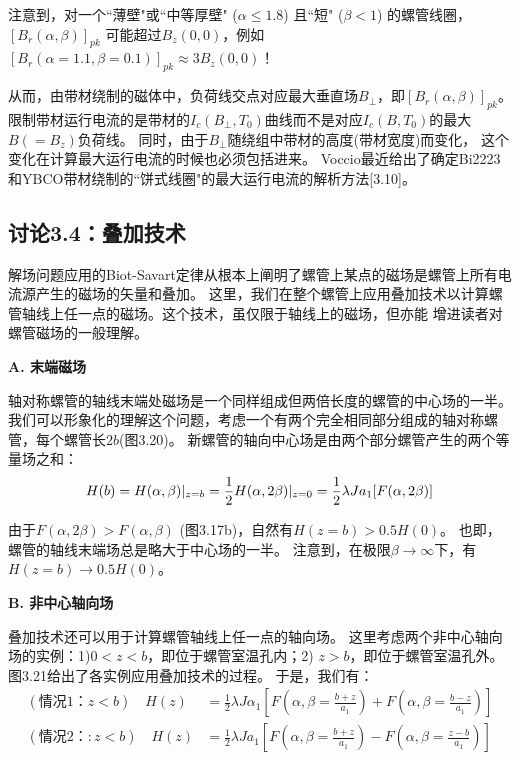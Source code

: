 注意到，对一个``薄壁"或``中等厚壁" ($\alpha \le 1.8$) 且``短" ($\beta < 1$) 的螺管线圈，
$[B_r(\alpha,\beta)]_{pk}$ 可能超过$B_z(0, 0)$，例如$[B_r(\alpha=1.1,\beta=0.1)]_{pk}\approx 3B_z(0,0)$！

从而，由带材绕制的磁体中，负荷线交点对应最大垂直场$B_{\perp}$，即$[B_r(\alpha,\beta)]_{pk}$。
限制带材运行电流的是带材的$I_c(B_{\perp},T_0)$曲线而不是对应$I_c(B, T_0)$的最大$B(=B_z)$负荷线。
同时，由于$B_{\perp}$随绕组中带材的高度(带材宽度)而变化，
这个变化在计算最大运行电流的时候也必须包括进来。
Voccio最近给出了确定Bi2223和YBCO带材绕制的``饼式线圈"的最大运行电流的解析方法[3.10]。



\subsection{讨论3.4：叠加技术}
解场问题应用的Biot-Savart定律从根本上阐明了螺管上某点的磁场是螺管上所有电流源产生的磁场的矢量和叠加。
这里，我们在整个螺管上应用叠加技术以计算螺管轴线上任一点的磁场。这个技术，虽仅限于轴线上的磁场，但亦能
增进读者对螺管磁场的一般理解。

\textbf{A. 末端磁场}

轴对称螺管的轴线末端处磁场是一个同样组成但两倍长度的螺管的中心场的一半。
我们可以形象化的理解这个问题，考虑一个有两个完全相同部分组成的轴对称螺管，每个螺管长$2b$(图3.20)。
新螺管的轴向中心场是由两个部分螺管产生的两个等量场之和：
\begin{equation}
H(b)=H(\alpha,\beta)|_{z=b}=\frac{1}{2}H(\alpha,2\beta)|_{z=0}=\frac{1}{2}\lambda Ja_{1}[F(\alpha,2\beta)]\\%
\end{equation}

由于$F(\alpha, 2\beta)>F(\alpha,\beta)$ (图3.17b)，自然有$H(z=b)>0.5H(0)$。
也即，螺管的轴线末端场总是略大于中心场的一半。
注意到，在极限$\beta\rightarrow\infty$下，有$H(z=b)\rightarrow 0.5H(0)$。

\textbf{B. 非中心轴向场}

叠加技术还可以用于计算螺管轴线上任一点的轴向场。
这里考虑两个非中心轴向场的实例：1)$0<z<b$，即位于螺管室温孔内；2) $z > b$，即位于螺管室温孔外。
图3.21给出了各实例应用叠加技术的过程。
于是，我们有：
\begin{subequations}
	\begin{align}
(\mbox{情况1：}z<b)\quad H(z)&=\frac{1}{2}\lambda J\alpha_{1}[F(\alpha,\beta=\frac{b+z}{a_{1}})+F(\alpha,\beta=\frac{b-z}{a_{1}})]\\%
(\mbox{情况2：}:z<b)\quad H(z)&=\frac{1}{2}\lambda Ja_{1}[F(\alpha,\beta=\frac{b+z}{a_{1}})-F(\alpha,\beta=\frac{z-b}{a_{1}})]%
	\end{align}
\end{subequations}

